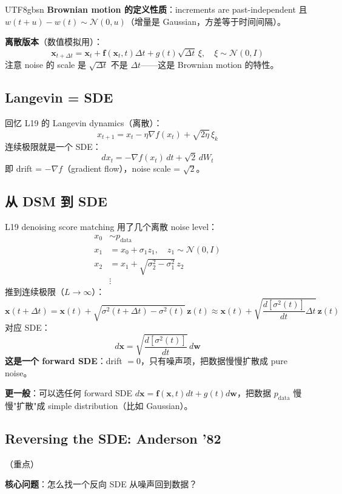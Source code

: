 \documentclass[11pt]{article}
\begin{document}
\begin{CJK}{UTF8}{gbsn}
\textbf{Brownian motion 的定义性质}：increments are past-independent 且 $w(t+u) - w(t) \sim \mathcal{N}(0, u)$（增量是 Gaussian，方差等于时间间隔）。

\textbf{离散版本}（数值模拟用）：
\[
\mathbf{x}_{t+\Delta t} = \mathbf{x}_t + \mathbf{f}(\mathbf{x}_t, t) \Delta t + g(t) \sqrt{\Delta t} \, \xi, \quad \xi \sim \mathcal{N}(0, I)
\]
注意 noise 的 scale 是 $\sqrt{\Delta t}$ 不是 $\Delta t$——这是 Brownian motion 的特性。

\subsection{Langevin = SDE}

回忆 L19 的 Langevin dynamics（离散）：
\[
x_{t+1} = x_t - \eta \nabla f(x_t) + \sqrt{2\eta} \, \xi_k
\]
连续极限就是一个 SDE：
\[
dx_t = -\nabla f(x_t) \, dt + \sqrt{2} \, dW_t
\]
即 drift = $-\nabla f$（gradient flow），noise scale = $\sqrt{2}$。

\subsection{从 DSM 到 SDE}

L19 denoising score matching 用了几个离散 noise level：
\begin{align*}
x_0 &\sim p_{\text{data}} \\
x_1 &= x_0 + \sigma_1 z_1, \quad z_1 \sim \mathcal{N}(0, I) \\
x_2 &= x_1 + \sqrt{\sigma_2^2 - \sigma_1^2} \, z_2 \\
&\vdots
\end{align*}
推到连续极限（$L \to \infty$）：
\[
\mathbf{x}(t + \Delta t) = \mathbf{x}(t) + \sqrt{\sigma^2(t + \Delta t) - \sigma^2(t)} \, \mathbf{z}(t) \approx \mathbf{x}(t) + \sqrt{\frac{d[\sigma^2(t)]}{dt} \Delta t} \, \mathbf{z}(t)
\]
对应 SDE：
\[
d\mathbf{x} = \sqrt{\frac{d[\sigma^2(t)]}{dt}} \, d\mathbf{w}
\]
\textbf{这是一个 forward SDE}：drift $= 0$，只有噪声项，把数据慢慢扩散成 pure noise。

\textbf{更一般}：可以选任何 forward SDE $d\mathbf{x} = \mathbf{f}(\mathbf{x}, t) dt + g(t) d\mathbf{w}$，把数据 $p_{\text{data}}$ 慢慢"扩散"成 simple distribution（比如 Gaussian）。

\subsection{Reversing the SDE: Anderson '82} （重点）

\textbf{核心问题}：怎么找一个反向 SDE 从噪声回到数据？


\end{CJK}
\end{document}
